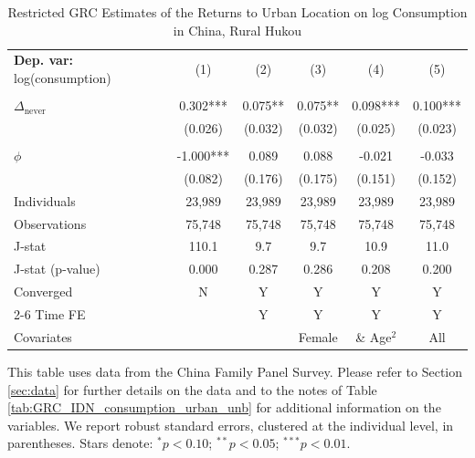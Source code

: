 \begin{table}[htbp] \centering \begin{threeparttable}
 \caption{Restricted GRC Estimates of the Returns to Urban Location on log Consumption in China, Rural Hukou} 
 \label{tab:GRC_CHN_rural_consumption_urban_unb_r} 
\begin{tabular}{l ccccc} \toprule  \textbf{Dep. var:}  log(consumption) 
                    &\multicolumn{1}{c}{(1)}   &\multicolumn{1}{c}{(2)}   &\multicolumn{1}{c}{(3)}   &\multicolumn{1}{c}{(4)}   &\multicolumn{1}{c}{(5)}   \\
                    &               &               &               &               &               \\
\addlinespace
$\Delta_{\text{never}}$&       0.302***&       0.075** &       0.075** &       0.098***&       0.100***\\
                    &     (0.026)   &     (0.032)   &     (0.032)   &     (0.025)   &     (0.023)   \\
                    &               &               &               &               &               \\
\addlinespace
$\phi$              &      -1.000***&       0.089   &       0.088   &      -0.021   &      -0.033   \\
                    &     (0.082)   &     (0.176)   &     (0.175)   &     (0.151)   &     (0.152)   \\
\addlinespace
Individuals         &      23,989   &      23,989   &      23,989   &      23,989   &      23,989   \\
Observations        &      75,748   &      75,748   &      75,748   &      75,748   &      75,748   \\
J-stat              &       110.1   &         9.7   &         9.7   &        10.9   &        11.0   \\
J-stat (p-value)    &       0.000   &       0.287   &       0.286   &       0.208   &       0.200   \\
Converged           &           N   &           Y   &           Y   &           Y   &           Y   \\
\cmidrule{2-6} Time FE & & Y & Y & Y & Y \\ Covariates & & & Female & \& Age$^2$ & All \\ \bottomrule \end{tabular} \begin{tablenotes}[flushleft] \footnotesize \item{This table uses data from the China Family Panel Survey. Please refer to Section \ref{sec:data} for further details on the data and to the notes of Table \ref{tab:GRC_IDN_consumption_urban_unb} for additional information on the variables. We report robust standard errors, clustered at the individual level, in parentheses. Stars denote: $^{*} p<0.10$; $^{**} p<0.05$; $^{***} p<0.01$.} \end{tablenotes} \end{threeparttable} \end{table}
